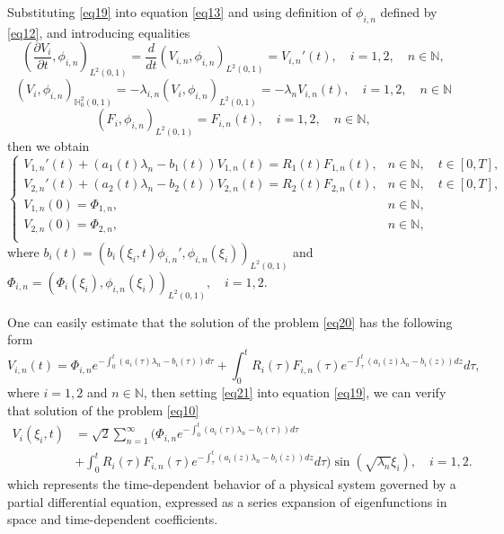 \documentclass[preprint,12pt,authoryear]{elsarticle}
\begin{document}
Substituting \eqref{eq19} into equation \eqref{eq13} and using definition of $\phi_{i,n}$ defined by \eqref{eq12}, and introducing equalities
$$\left(\dfrac{\partial V_i}{\partial t},\phi_{i,n}\right)_{L^2(0,1)}=\dfrac{d}{dt}\left(V_{i,n},\phi_{i,n}\right)_{L^2(0,1)}=V_{i,n}'(t),\quad i=1,2,\quad n\in\mathbb{N},$$
$$\left(V_i,\phi_{i,n}\right)_{\mathbb{H}_0^2(0,1)}=-\lambda_{i,n}\left(V_i,\phi_{i,n}\right)_{L^2(0,1)}=-\lambda_{n}V_{i,n}(t),\quad i=1,2, \quad n\in\mathbb{N}$$
$$(F_{i},\phi_{i,n})_{L^2(0,1)}=F_{i,n}(t),\quad i=1,2,\quad n\in\mathbb{N},$$
then we obtain 
\begin{equation}\label{eq20}
    \begin{cases}
        V_{1,n}'(t)+(a_1(t)\lambda_{n}-b_1(t))V_{1,n}(t)=R_1(t)F_{1,n}(t),& n\in\mathbb{N},\quad t\in[0,T],\\
    V_{2,n}'(t)+(a_2(t)\lambda_{n}-b_2(t))V_{2,n}(t)=R_2(t)F_{2,n}(t),& n\in\mathbb{N},\quad t\in[0,T],\\
    V_{1,n}(0)=\Phi_{1,n}, & n\in\mathbb{N},\\
    V_{2,n}(0)=\Phi_{2,n}, & n\in\mathbb{N},\\
    \end{cases}
\end{equation}
where $b_i(t)=\left(b_{i}(\xi_i,t)\phi_{i,n}',\phi_{i,n}(\xi_i)\right)_{L^2(0,1)}$ and $\Phi_{i,n}=\left(\Phi_i(\xi_i),\phi_{i,n}(\xi_i)\right)_{L^2(0,1)},\quad i=1,2$.

One can easily estimate that the solution of the problem \eqref{eq20} has the following form
\begin{equation}\label{eq21}
    V_{i,n}(t)=\Phi_{i,n}e^{-\int_0^t(a_i(\tau)\lambda_{n}-b_i(\tau))d\tau}+\int_0^tR_i(\tau)F_{i,n}(\tau)e^{-\int_{\tau}^t(a_i(z)\lambda_{n}-b_i(z))dz}d\tau,
\end{equation}
where $i=1,2$ and $n\in\mathbb{N}$, then setting \eqref{eq21} into equation \eqref{eq19}, we can verify that solution of the problem \eqref{eq10}
\begin{equation}\label{eq22}
    \begin{split}
        V_i(\xi_i,t)&=\sqrt{2}\sum\limits_{n=1}^{\infty}\Bigg(\Phi_{i,n}e^{-\int_0^t(a_i(\tau)\lambda_{n}-b_i(\tau))d\tau}\\
        &+\int_0^tR_i(\tau)F_{i,n}(\tau)e^{-\int_{\tau}^t(a_i(z)\lambda_{n}-b_i(z))dz}d\tau\Bigg)\sin\left(\sqrt{\lambda_{n}}\xi_i\right),\quad i=1,2.
    \end{split}
\end{equation}
which represents the time-dependent behavior of a physical system governed by a partial differential equation, expressed as a series expansion of eigenfunctions in space and time-dependent coefficients. 
\end{document}
